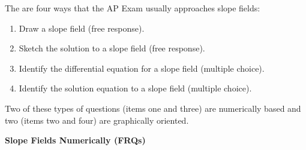 The are four ways that the AP Exam usually approaches slope fields: \begin{enumerate}
    \item Draw a slope field (free response). 
    \item Sketch the solution to a slope field (free response).
    \item Identify the differential equation for a slope field (multiple choice).
    \item Identify the solution equation to a slope field (multiple choice).
\end{enumerate}

Two of these types of questions (items one and three) are numerically based and two (items two and four) are graphically oriented. \par

\bigskip

\textbf{\large{Slope Fields Numerically (FRQs)}} \par

